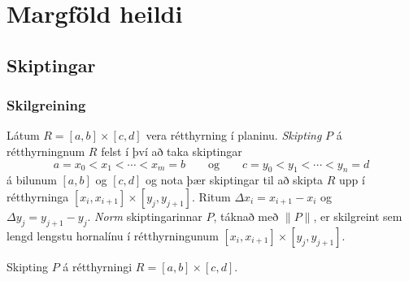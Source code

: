 
\theoremstyle{definition}
\newtheorem{exercise}[theorem]{}





\newbox\mytempbox
\newdimen\mytempdimen

\newcommand\includegraphicscopyright[3][]{%
  \leavevmode\vbox{\vskip3pt\raggedright\setbox\mytempbox=\hbox{\texttt{[image: \#2]}}%
    \mytempdimen=\wd\mytempbox\box\mytempbox\par\vskip1pt%
    \fontsize{3}{3.5}\selectfont{\color{black!25}{\vbox{\hsize=\mytempdimen#3}}}\vskip3pt%
}}

\newenvironment{colortabular}[1]{\medskip\rowcolors[]{1}{blue!20}{blue!10}\tabular{#1}\rowcolor{blue!40}}{\endtabular\medskip}

\def\equad{\leavevmode\hbox{}\quad}

\newenvironment{greencolortabular}[1]
{\medskip\rowcolors[]{1}{green!50!black!20}{green!50!black!10}%
  \tabular{#1}\rowcolor{green!50!black!40}}%
{\endtabular\medskip}




\section{Margföld heildi}


\subsection{Skiptingar} 

\subsubsection{Skilgreining }
Látum $R=[a,b]\times[c,d]$ vera
rétthyrning í planinu.  {\em Skipting} $P$ á rétthyrningnum $R$ felst í
því að taka skiptingar
$$a=x_0<x_1<\cdots<x_m=b\qquad\mbox{og}\qquad
c=y_0<y_1<\cdots<y_n=d$$
 á bilunum $[a,b]$ og $[c,d]$ og nota þær skiptingar til að skipta $R$
 upp í rétthyrninga $[x_i,x_{i+1}]\times [y_j,y_{j+1}]$.  
Ritum $\Delta x_i=x_{i+1}-x_i$ og  $\Delta y_j=y_{j+1}-y_j$.
{\em Norm} skiptingarinnar $P$, táknað með $\|P\|$,  
er skilgreint sem lengd lengstu hornalínu í
   rétthyrningunum $[x_i,x_{i+1}]\times [y_j,y_{j+1}]$.



Skipting $P$ á rétthyrningi $R= [a,b]\times [c,d]$.

